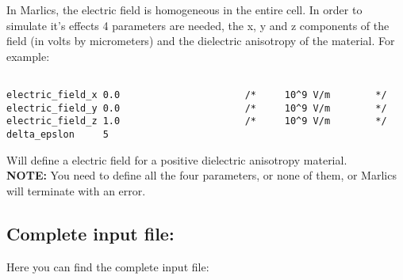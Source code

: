 \documentclass{article}
\begin{document}
In Marlics, the electric field is homogeneous in the entire cell. In order to simulate it's effects 4 parameters are needed, the x, y and z components of the field (in volts by micrometers) and the dielectric anisotropy of the material. For example:

\begin{lstlisting}

electric_field_x 0.0                      /*     10^9 V/m        */
electric_field_y 0.0                      /*     10^9 V/m        */
electric_field_z 1.0                      /*     10^9 V/m        */
delta_epslon     5	
\end{lstlisting}

Will define a electric field for a positive dielectric anisotropy material.\\
\textbf{NOTE:} You need to define all the four parameters, or none of them, or Marlics will terminate with an error.

\subsection{Complete input file:}

Here you can find the complete input file:
\end{document}
